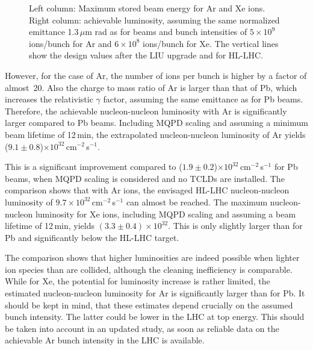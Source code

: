 \begin{figure}[t]
\begin{minipage}[b]{.49\linewidth}
\end{minipage}
\caption{Left column: Maximum stored beam energy for Ar and Xe ions. Right column: achievable luminosity, assuming the same normalized emittance 1.3$\,\mu$m rad as for \lead beams and bunch intensities of $5 \times 10^9$ ions/bunch for Ar and $6\times 10^8$ ions/bunch for Xe. The vertical lines show the \lead design values after the LIU upgrade and for HL-LHC. }
\label{pic:arxe:lumi}
\end{figure}
%
%

However, for the case of Ar, the number of ions per bunch is higher by a factor of \mbox{almost 20}. Also the charge to mass ratio of Ar is larger than that of Pb, which increases the relativistic $\gamma$ factor, assuming the same emittance as for Pb beams. Therefore, the achievable nucleon-nucleon luminosity with Ar is significantly larger compared to Pb beams. Including MQPD scaling and assuming a minimum beam lifetime of 12\,min, the extrapolated nucleon-nucleon luminosity of Ar yields ($9.1\pm 0.8$)$\times 10^{32}$\,cm$^{-2}$\,s$^{-1}$. 


This is a significant improvement compared to ($1.9\pm 0.2$)$\times 10^{32}$\,cm$^{-2}$\,s$^{-1}$ for Pb beams, when MQPD scaling is considered and no TCLDs are installed. The comparison shows that with Ar ions, the envisaged HL-LHC nucleon-nucleon luminosity of $9.7 \times 10^{32}$\,cm$^{-2}$\,s$^{-1}$ can almost be reached. The maximum nucleon-nucleon luminosity for Xe ions, including MQPD scaling and assuming a beam lifetime of 12\,min, yields \mbox{$(3.3\pm 0.4)\times 10^{32}$}. This is only slightly larger than for Pb and significantly below the HL-LHC target. 

The comparison shows that higher luminosities are indeed possible when lighter ion species than \lead are collided, although the cleaning inefficiency is comparable. While for Xe, the potential for luminosity increase is rather limited, the estimated nucleon-nucleon luminosity for Ar is significantly larger than for Pb. It should be kept in mind, that these estimates depend crucially on the assumed bunch intensity. The latter could be lower in the LHC at top energy. This should be taken into account in an updated study, as soon as reliable data on the achievable Ar bunch intensity in the LHC is available. 


